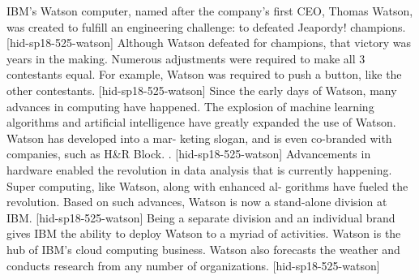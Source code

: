 IBM’s Watson computer, named after the company’s first CEO, 
Thomas Watson, was created to fulfill an engineering challenge: 
to defeated Jeapordy! champions. [hid-sp18-525-watson] Although 
Watson defeated for champions, that victory was years in the making. 
Numerous adjustments were required to make all 3 contestants equal. 
For example, Watson was required to push a button, like the other 
contestants. [hid-sp18-525-watson]
Since the early days of Watson, many advances in computing have 
happened. The explosion of machine learning algorithms and artificial
intelligence have greatly expanded the use of Watson. Watson has 
developed into a mar- keting slogan, and is even co-branded with 
companies, such as H&R Block. . [hid-sp18-525-watson]
Advancements in hardware enabled the revolution in data analysis that 
is currently happening. Super computing, like Watson, along with 
enhanced al- gorithms have fueled the revolution. Based on such 
advances, Watson is now a stand-alone division at IBM. 
[hid-sp18-525-watson] Being a separate division and an individual 
brand gives IBM the ability to deploy Watson to a myriad of 
activities. Watson is the hub of IBM’s cloud computing business. 
Watson also forecasts the weather and conducts research from any 
number of organizations. [hid-sp18-525-watson]

